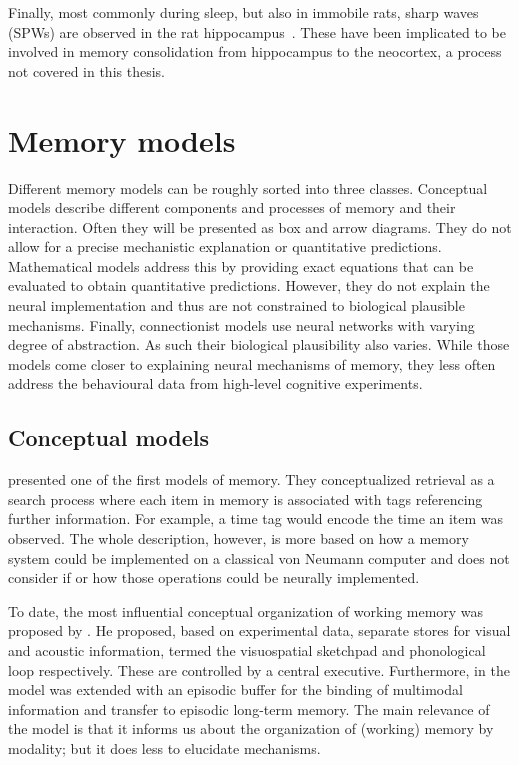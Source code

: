 Finally, most commonly during sleep, but also in immobile rats, sharp waves (SPWs) are observed in the rat hippocampus~\parencite{chrobak1994,girardeau2009}.
These have been implicated to be involved in memory consolidation from hippocampus to the neocortex, a process not covered in this thesis.


\section{Memory models}
Different memory models can be roughly sorted into three classes.
Conceptual models describe different components and processes of memory and their interaction.
Often they will be presented as box and arrow diagrams.
They do not allow for a precise mechanistic explanation or quantitative predictions.
Mathematical models address this by providing exact equations that can be evaluated to obtain quantitative predictions.
However, they do not explain the neural implementation and thus are not constrained to biological plausible mechanisms.
Finally, connectionist models use neural networks with varying degree of abstraction.
As such their biological plausibility also varies.
While those models come closer to explaining neural mechanisms of memory, they less often address the behavioural data from high-level cognitive experiments.

\subsection{Conceptual models}
\Textcite{Yntema1963} presented one of the first models of memory.
They conceptualized retrieval as a search process where each item in memory is associated with tags referencing further information.
For example, a time tag would encode the time an item was observed.
The whole description, however, is more based on how a memory system could be implemented on a classical von Neumann computer and does not consider if or how those operations could be neurally implemented.

To date, the most influential conceptual organization of working memory was proposed by \textcite{Baddeley1986}.
He proposed, based on experimental data, separate stores for visual and acoustic information, termed the visuospatial sketchpad and phonological loop respectively.
These are controlled by a central executive.
Furthermore, in \textcite{Baddeley2000} the model was extended with an episodic buffer for the binding of multimodal information and transfer to episodic long-term memory.
The main relevance of the model is that it informs us about the organization of (working) memory by modality; but it does less to elucidate mechanisms.

